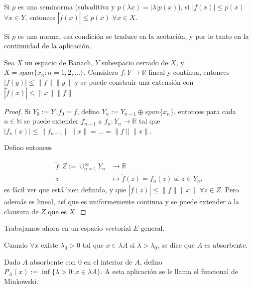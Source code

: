 \begin{corollary}
  Si $p$ es una seminorma (subaditiva y $p(\lambda x)=|\lambda|p(x)$), si
  $|f(x)|\le p(x)$ $\forall x\in Y$, entonces $|\tilde{f}(x)|\le p(x)$ $\forall
  x\in X$.
\end{corollary}

\begin{remark}
  Si $p$ es una norma, esa condición se traduce en la acotación, y por lo tanto
  en la continuidad de la aplicación.
\end{remark}

\begin{theorem}
  Sea $X$ un espacio de Banach, $Y$ subespacio cerrado de $X$, y
  $X=\overline{span} \{x_n:n=1,2,\ldots\} $. Considero $f:Y\to \mathbb{R}$ lineal
  y continua, entonces $|f(y)|\le \|f\|\|y\|$ y se puede construir una
  extensión con $|\tilde{f}(x)|\le \|x\|\|f\|$
\end{theorem}

\begin{proof}
  Si $Y_0:=Y,f_0=f$, defino $Y_n:=Y_{n-1}\oplus span \{x_n\}$, entonces para cada
  $n\in \mathbb{N}$ se puede extender $f_{n-1}$ a $f_n:Y_n\to \mathbb{R}$ tal
  que $|f_n(x)|\le \|f_{n-1}\|\|x\|=\ldots=\|f\|\|x\|$.

  Defino entonces

  \begin{align*}
    \tilde{f}: Z:=\cup_{n=1}^\infty Y_n &\longrightarrow \mathbb{R} \\
    z &\longmapsto \tilde{f}(z) = f_n(z) \text{ si } z\in Y_n
  ,\end{align*}
  es fácil ver que está bien definida, y que $|\tilde{f}(z)|\le \|f\|\|x\|$
  $\forall z\in Z$. Pero además es lineal, así que es uniformemente continua y
  se puede extender a la clausura de $Z$ que es $X$.
\end{proof}

Trabajamos ahora en un espacio vectorial $E$ general.

\begin{definition}
  Cuando $\forall x$ existe $\lambda_0>0$ tal que $x\in \lambda A$ si
  $\lambda>\lambda_0$, se dice que $A$ es absorbente.
\end{definition}

\begin{definition}
  Dado $A$ absorbente con $0$ en el interior de $A$, defino $P_A(x):= \inf \{\lambda>0:x\in
  \lambda A\} $. A esta aplicación se le llama el funcional de Minkowski.
\end{definition}

